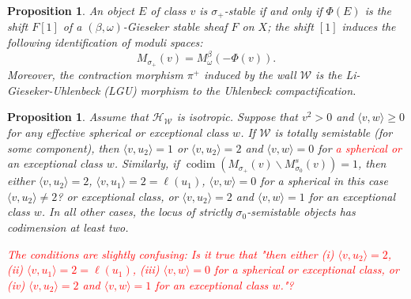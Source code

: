 \documentclass[leqno,11pt]{amsart}
\def\Z{\ensuremath{\mathbb{Z}}}
\def\codim{\mathop{\mathrm{codim}}\nolimits}
\newtheorem{Prop}[Thm]{Proposition}
\theoremstyle{definition}
\def\Z{\ensuremath{\mathbb{Z}}}
\def\HH{\ensuremath{\mathcal H}}
\def\WW{\ensuremath{\mathcal W}}
\newcommand{\todo}[1]{\vspace{5 mm}\par \noindent
\marginpar{\textsc{ToDo}}
\framebox{\begin{minipage}[c]{0.95 \textwidth}
\tt #1 \end{minipage}}\vspace{5 mm}\par}
\begin{document}
\begin{Prop}\label{Prop:Uhlenbeck morphism}
An object $E$ of class $v$ is $\sigma_+$-stable if and only if $\Phi(E)$ is the shift $F[1]$ of a $(\beta,\omega)$-Gieseker stable sheaf $F$ on $X$; the shift $[1]$ induces the following identification of moduli spaces: $$M_{\sigma_+}(v) = M_{\omega}^{\beta}(-\Phi(v)).$$
Moreover, the contraction morphism $\pi^+$ induced by the wall $\WW$ is the Li-Gieseker-Uhlenbeck (LGU) morphism to the Uhlenbeck compactification.
\end{Prop}

\begin{Prop}\label{Prop:LGU walls of low codimension}
Assume that $\HH_{\WW}$ is isotropic.  Suppose that $v^2>0$ and $\langle v,w\rangle\geq 0$ for any effective spherical or exceptional class $w$.  If $\WW$ is totally semistable (for some component), then $\langle v,u_2\rangle=1$ or $\langle v,u_2\rangle=2$ and $\langle v,w\rangle=0$ for \textcolor{red}{a spherical or} an exceptional class $w$.  Similarly, if $\codim(M_{\sigma_+}(v)\backslash M^s_{\sigma_0}(v))=1$, then either $\langle v,u_2\rangle=2$, $\langle v,u_1\rangle=2=\ell(u_1)$, $\langle v,w\rangle=0$ for a spherical {\color{red} in this case $\langle v,u_2 \rangle \ne 2$?} or exceptional class, or $\langle v,u_2\rangle=2$ and $\langle v,w\rangle=1$ for an exceptional class $w$.  In all other cases, the locus of strictly $\sigma_0$-semistable objects has codimension at least two.

\textcolor{red}{The conditions are slightly confusing:
Is it true that
"then either (i) $\langle v,u_2\rangle=2$, (ii) $\langle v,u_1\rangle=2=\ell(u_1)$, (iii) $\langle v,w\rangle=0$ for a spherical or exceptional class, or (iv) $\langle v,u_2\rangle=2$ and $\langle v,w\rangle=1$ for an exceptional class $w$."?
}
\end{Prop}
\end{document}
